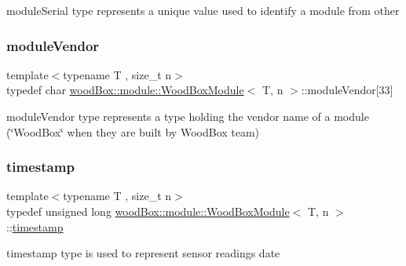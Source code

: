 module\+Serial type represents a unique value used to identify a module from other \mbox{\label{classwood_box_1_1module_1_1_wood_box_module_adf5d59bae2980ff138284d0fa885df19}} 
\subsubsection{\texorpdfstring{module\+Vendor}{moduleVendor}}
{\footnotesize\ttfamily template$<$typename T , size\+\_\+t n$>$ \\
typedef char \mbox{\hyperlink{classwood_box_1_1module_1_1_wood_box_module}{wood\+Box\+::module\+::\+Wood\+Box\+Module}}$<$ T, n $>$\+::module\+Vendor\mbox{[}33\mbox{]}}

module\+Vendor type represents a type holding the vendor name of a module (\char`\"{}\+Wood\+Box\char`\"{} when they are built by Wood\+Box team) \mbox{\label{classwood_box_1_1module_1_1_wood_box_module_ab03bf835ec02656605c3c0df0188dc28}} 
\subsubsection{\texorpdfstring{timestamp}{timestamp}}
{\footnotesize\ttfamily template$<$typename T , size\+\_\+t n$>$ \\
typedef unsigned long \mbox{\hyperlink{classwood_box_1_1module_1_1_wood_box_module}{wood\+Box\+::module\+::\+Wood\+Box\+Module}}$<$ T, n $>$\+::\mbox{\hyperlink{classwood_box_1_1module_1_1_wood_box_module_ab03bf835ec02656605c3c0df0188dc28}{timestamp}}}

timestamp type is used to represent sensor readings date \mbox{\label{classwood_box_1_1module_1_1_wood_box_module_ab0e08bb82f5585fd357ce1881855d0e2}} 

